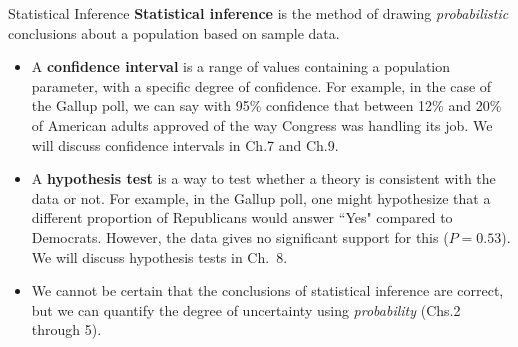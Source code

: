 \documentclass{beamer}
\renewcommand{\emph}{\textbf}
\begin{document}
\begin{frame}{Statistical Inference}
\emph{Statistical inference} is the method of drawing \textit{probabilistic} conclusions about a population based on sample data. 
\begin{itemize}
\pause\item A \emph{confidence interval} is a range of values containing a population parameter, with a specific degree of confidence. For example, in the case of the Gallup poll, we can say with 95\% confidence that between 12\% and 20\% of American adults approved of the way Congress was handling its job.
We will discuss confidence intervals in Ch.\@ 7 and Ch.\@ 9.
\pause\item A \emph{hypothesis test} is a way to test whether a theory is consistent with the data or not. 
For example, in the Gallup poll, one might hypothesize that a different proportion of Republicans would answer ``Yes" compared to Democrats. However, the data gives no significant support for this ($P=0.53$).  We will discuss hypothesis tests in Ch.~8.
\pause \item We cannot be certain that the conclusions of statistical inference are correct, but we can quantify the degree of uncertainty using \textit{probability} (Chs.\@ 2 through 5).
\end{itemize}
\end{frame}
\end{document}
